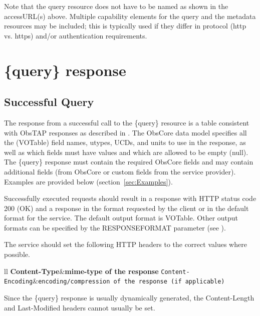 \documentclass[11pt,a4paper]{ivoa}
\begin{document}
Note that the {query} resource does not have to be named as shown in the accessURL(s) above. Multiple capability elements for the {query} and the {metadata} resources may be included; this is typically used if they differ in protocol (http vs. https) and/or authentication requirements.

\section{\{query\} response}
\label{sec:queryresponse}

\subsection{Successful Query}
\label{sec:succesful}

The response from a successful call to the \{query\} resource is a table consistent with  ObsTAP responses as described in \cite{std:OBSCORE}. The ObsCore data model specifies all the (VOTable) field names, utypes, UCDs, and units to use in the response, as well as which fields must have values and which are allowed to be empty (null). The \{query\} response must contain the required ObsCore fields and may contain additional fields (from ObsCore or custom fields from the service provider). Examples are provided below (section~\ref{sec:Examples}).

Successfully executed requests should result in a response with HTTP status code 200 (OK) and a response in the format requested by the client or in the default format for the service. The default output format is VOTable. Other output formats can be specified by the RESPONSEFORMAT parameter (see \cite{std:DALI}).

The service should set the following HTTP headers to the correct values where possible.
\begin{table}[H]
\begin{tabular}{ll}
\sptablerule
\textbf{Content-Type}&\textbf{mime-type of the response}\cr
\sptablerule
\texttt{Content-Encoding}&\texttt{encoding/compression of the response (if applicable)}\cr
\sptablerule
\end{tabular}
\caption{Recommended HTTP Response Headers}
\label{tab:RespHead}
\end{table}





Since the \{query\} response is usually dynamically generated, the Content-Length and Last-Modified headers cannot usually be set.
\end{document}
